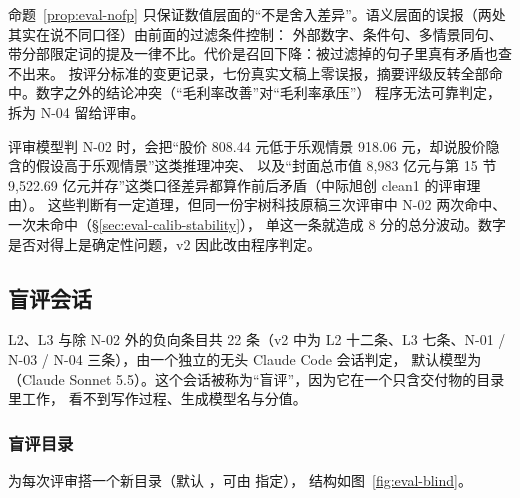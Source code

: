 命题~\ref{prop:eval-nofp} 只保证数值层面的“不是舍入差异”。语义层面的误报（两处其实在说不同口径）由前面的过滤条件控制：
外部数字、条件句、多情景同句、带分部限定词的提及一律不比。代价是召回下降：被过滤掉的句子里真有矛盾也查不出来。
按评分标准的变更记录，七份真实文稿上零误报，摘要评级反转全部命中。数字之外的结论冲突（“毛利率改善”对“毛利率承压”）
程序无法可靠判定，拆为 N-04 留给评审。

\begin{failcase}[：v0 / v1 中由评审判定的 N-02]
评审模型判 N-02 时，会把“股价 808.44 元低于乐观情景 918.06 元，却说股价隐含的假设高于乐观情景”这类推理冲突、
以及“封面总市值 8,983 亿元与第 15 节 9,522.69 亿元并存”这类口径差异都算作前后矛盾（中际旭创 clean1 的评审理由）。
这些判断有一定道理，但同一份宇树科技原稿三次评审中 N-02 两次命中、一次未命中（\S\ref{sec:eval-calib-stability}），
单这一条就造成 8 分的总分波动。数字是否对得上是确定性问题，v2 因此改由程序判定。
\end{failcase}

\subsection{盲评会话}
\label{sec:eval-judge}

L2、L3 与除 N-02 外的负向条目共 22 条（v2 中为 L2 十二条、L3 七条、N-01 / N-03 / N-04 三条），由一个独立的无头 Claude Code 会话判定，
默认模型为 （Claude Sonnet 5.5）。这个会话被称为“盲评”，因为它在一个只含交付物的目录里工作，
看不到写作过程、生成模型名与分值。

\subsubsection{盲评目录}

 为每次评审搭一个新目录（默认 ，可由  指定），
结构如图~\ref{fig:eval-blind}。

